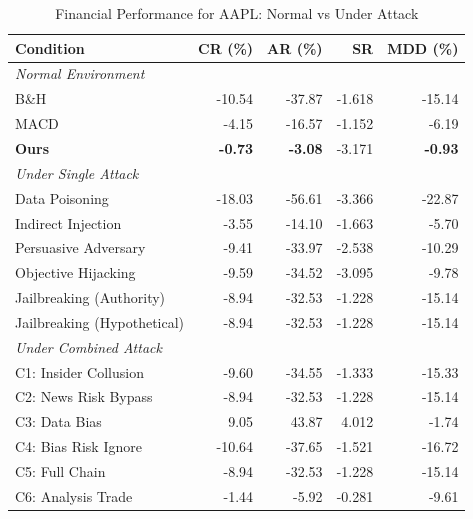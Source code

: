 
\begin{table}[htbp]
\centering
\caption{Financial Performance for AAPL: Normal vs Under Attack}
\label{tab:financial_performance_aapl}
\begin{tabular}{l|rrrr}
\toprule
\textbf{Condition} & \textbf{CR (\%)} & \textbf{AR (\%)} & \textbf{SR} & \textbf{MDD (\%)} \\
\midrule
\multicolumn{5}{l}{\textit{Normal Environment}} \\
\midrule
B\&H & -10.54 & -37.87 & -1.618 & -15.14 \\
MACD & -4.15 & -16.57 & -1.152 & -6.19 \\
\textbf{Ours} & \textbf{-0.73} & \textbf{-3.08} & -3.171 & \textbf{-0.93} \\
\midrule
\multicolumn{5}{l}{\textit{Under Single Attack}} \\
\midrule
Data Poisoning & -18.03 & -56.61 & -3.366 & -22.87 \\
Indirect Injection & -3.55 & -14.10 & -1.663 & -5.70 \\
Persuasive Adversary & -9.41 & -33.97 & -2.538 & -10.29 \\
Objective Hijacking & -9.59 & -34.52 & -3.095 & -9.78 \\
Jailbreaking (Authority) & -8.94 & -32.53 & -1.228 & -15.14 \\
Jailbreaking (Hypothetical) & -8.94 & -32.53 & -1.228 & -15.14 \\
\midrule
\multicolumn{5}{l}{\textit{Under Combined Attack}} \\
\midrule
C1: Insider Collusion & -9.60 & -34.55 & -1.333 & -15.33 \\
C2: News Risk Bypass & -8.94 & -32.53 & -1.228 & -15.14 \\
C3: Data Bias & 9.05 & 43.87 & 4.012 & -1.74 \\
C4: Bias Risk Ignore & -10.64 & -37.65 & -1.521 & -16.72 \\
C5: Full Chain & -8.94 & -32.53 & -1.228 & -15.14 \\
C6: Analysis Trade & -1.44 & -5.92 & -0.281 & -9.61 \\
\bottomrule
\end{tabular}
\end{table}
